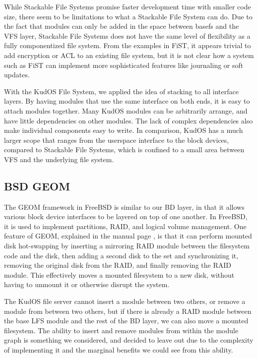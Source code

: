 While Stackable File Systems promise faster development time with smaller code
size, there seem to be limitations to what a Stackable File System can do.
Due to the fact that modules can only be added in the space between basefs and
the VFS layer, Stackable File Systems does not have the same level of
flexibility as a fully componentized file system. From the examples in FiST, it
appears trivial to add encryption or ACL to an existing file system, but it is
not clear how a system such as FiST can implement more sophisticated features
like journaling or soft updates.

With the KudOS File System, we applied the idea of stacking to all interface
layers. By having modules that use the same interface on both ends, it is easy
to attach modules together. Many KudOS modules can be arbitrarily arrange, and
have little dependencies on other modules. The lack of complex dependencies also
make individual components easy to write. In comparison, KudOS has a much larger
scope that ranges from the userspace interface to the block devices, compared to
Stackable File Systems, which is confined to a small area between VFS and the
underlying file system.

\subsection{BSD GEOM}
\label{sec:related:geom}

The GEOM framework in FreeBSD is similar to our BD layer, in that it allows
various block device interfaces to be layered on top of one another. In FreeBSD,
it is used to implement partitions, RAID, and logical volume management. One
feature of GEOM, explained in the manual page \cite{geom}, is that it can
perform mounted disk hot-swapping by inserting a mirroring RAID module between
the filesystem code and the disk, then adding a second disk to the set and
synchronizing it, removing the original disk from the RAID, and finally removing
the RAID module. This effectively moves a mounted filesystem to a new disk,
without having to unmount it or otherwise disrupt the system.

The KudOS file server cannot insert a module between two others, or remove a
module from between two others, but if there is already a RAID module between
the base LFS module and the rest of the BD layer, we can also move a mounted
filesystem. The ability to insert and remove modules from within the module
graph is something we considered, and decided to leave out due to the complexity
of implementing it and the marginal benefits we could see from this ability.

